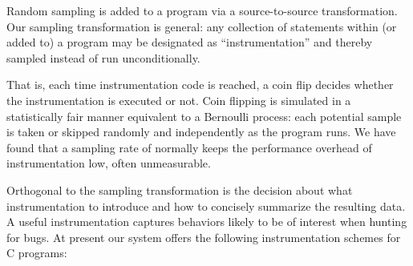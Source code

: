 \documentclass[draft]{sig-alternate}
\newcommand{\issue}[2][]{}
\begin{document}
Random sampling is added to a program via a source-to-source transformation.
Our sampling transformation is general: any collection of
statements within (or added to) a program may be designated as
``instrumentation'' and thereby sampled instead of run
unconditionally.
\issue[Mayur]{"Our sampling transformation is general: any collection
  of statements within (or added to) a program may be designated as
  "instrumentation" and thereby sampled instead of run conditionally"

  I didn't get the "within (or added to)" part.  I thought
  instrumented code always refers to code that is added, and not code
  that is within?

  Ben later clarified this but we need to put it into the paper:

  We can treat existing code as instrumentation to be sampled even if
  we didn't add it ourself.  \texttt{assert()} statements are a clear
  candidate for this sort of thing.  Our PLDI 2003 paper did this with
  the assert-like statements added by CCured.  From our perspective,
  that code is "within" the program, not "added to" it.}
That is, each time instrumentation code is reached,
a coin flip decides whether the instrumentation is executed or not.
Coin flipping is simulated in a statistically fair
manner equivalent to a Bernoulli process: each potential sample is
taken or skipped randomly and independently as the program runs.
We have found that a sampling rate of  normally keeps the performance overhead
of instrumentation low, often unmeasurable.
\issue[Alice]{Is this true?  I thought Ben's thesis would claim otherwise.}

Orthogonal to the sampling transformation is the decision about what
instrumentation to introduce and how to concisely summarize the
resulting data.  A useful instrumentation captures behaviors likely to
be of interest when hunting for bugs.  At present our system offers
the following instrumentation schemes for C programs:
\end{document}
